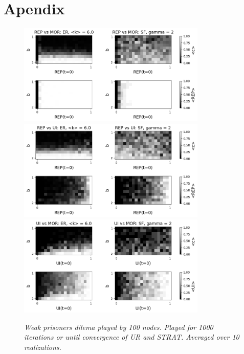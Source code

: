 \section{Apendix}

\begin{figure}[H]
\begin{center}
	\includegraphics[width=0.8\textwidth]{mat1.png}
	\includegraphics[width=0.8\textwidth]{mat2.png}
	\includegraphics[width=0.8\textwidth]{mat3.png}
 
	\caption{\emph{ Weak prisoners dilema  played by 100 nodes. Played for 1000 iterations or until convergence of UR and STRAT.  Averaged over 10 realizations.}}
	\label{mat}
\end{center}
\end{figure}



